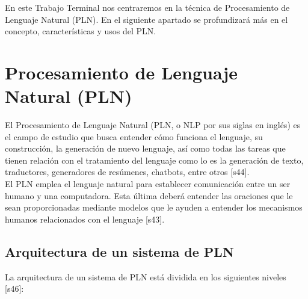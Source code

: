 En este Trabajo Terminal nos centraremos en la técnica de Procesamiento de Lenguaje Natural (PLN). En el siguiente apartado se profundizará más en el concepto, características y usos del PLN.\\

\section{Procesamiento de Lenguaje Natural (PLN)}
El Procesamiento de Lenguaje Natural (PLN, o NLP por sus siglas en inglés) es el campo de estudio que busca entender cómo funciona el lenguaje, su construcción, la generación de nuevo lenguaje, así como todas las tareas que tienen relación con el tratamiento del lenguaje como lo es la generación de texto, traductores, generadores de resúmenes, chatbots, entre otros [s44].\\

El PLN emplea el lenguaje natural para establecer comunicación entre un ser humano y una computadora. Esta última deberá entender las oraciones que le sean proporcionadas mediante modelos que le ayuden a entender los mecanismos humanos relacionados con el lenguaje [s43]. 


\subsection{Arquitectura de un sistema de PLN}

La arquitectura de un sistema de PLN está dividida en los siguientes niveles [s46]:\

